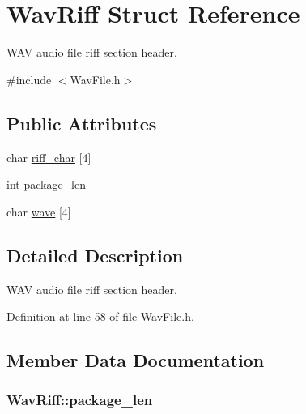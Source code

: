 \hypertarget{struct_wav_riff}{}\section{Wav\+Riff Struct Reference}
\label{struct_wav_riff}


W\+AV audio file \textquotesingle{}riff\textquotesingle{} section header.  




{\ttfamily \#include $<$Wav\+File.\+h$>$}

\subsection*{Public Attributes}
\begin{DoxyCompactItemize}
\item 
char \hyperlink{struct_wav_riff_a3a837eae50605a8970a32ff4436dbac2}{riff\+\_\+char} \mbox{[}4\mbox{]}
\item 
\hyperlink{xmltok_8h_a5a0d4a5641ce434f1d23533f2b2e6653}{int} \hyperlink{struct_wav_riff_a938640a7fce760b3a44af1a778eb9136}{package\+\_\+len}
\item 
char \hyperlink{struct_wav_riff_ac7f63e2ddeb71c3915914e044f0a2cba}{wave} \mbox{[}4\mbox{]}
\end{DoxyCompactItemize}


\subsection{Detailed Description}
W\+AV audio file \textquotesingle{}riff\textquotesingle{} section header. 

Definition at line 58 of file Wav\+File.\+h.



\subsection{Member Data Documentation}
\subsubsection[{\texorpdfstring{package\+\_\+len}{package_len}}]{ Wav\+Riff\+::package\+\_\+len}\hypertarget{struct_wav_riff_a938640a7fce760b3a44af1a778eb9136}{}\label{struct_wav_riff_a938640a7fce760b3a44af1a778eb9136}


